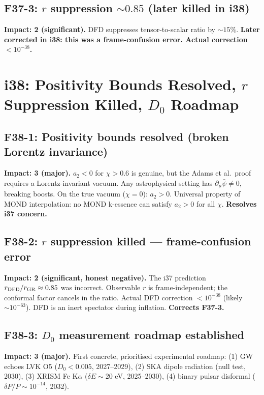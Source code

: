 \documentclass[11pt,a4paper]{article}
\begin{document}
\subsection{F37-3: $r$ suppression $\sim 0.85$ (later killed in i38)}
\textbf{Impact: 2 (significant).} DFD suppresses tensor-to-scalar ratio by $\sim 15\%$. \textbf{Later corrected in i38: this was a frame-confusion error. Actual correction $< 10^{-38}$.}

\section{i38: Positivity Bounds Resolved, $r$ Suppression Killed, $D_0$ Roadmap}
\label{sec:i38}

\subsection{F38-1: Positivity bounds resolved (broken Lorentz invariance)}
\textbf{Impact: 3 (major).} $a_2 < 0$ for $\chi > 0.6$ is genuine, but the Adams et al.\ proof requires a Lorentz-invariant vacuum. Any astrophysical setting has $\partial_\mu\bar\psi \neq 0$, breaking boosts. On the true vacuum ($\chi = 0$): $a_2 > 0$. Universal property of MOND interpolation: no MOND k-essence can satisfy $a_2 > 0$ for all $\chi$. \textbf{Resolves i37 concern.}

\subsection{F38-2: $r$ suppression killed --- frame-confusion error}
\textbf{Impact: 2 (significant, honest negative).} The i37 prediction $r_{\rm DFD}/r_{\rm GR} \approx 0.85$ was incorrect. Observable $r$ is frame-independent; the conformal factor cancels in the ratio. Actual DFD correction $< 10^{-38}$ (likely $\sim 10^{-63}$). DFD is an inert spectator during inflation. \textbf{Corrects F37-3.}

\subsection{F38-3: $D_0$ measurement roadmap established}
\textbf{Impact: 3 (major).} First concrete, prioritised experimental roadmap: (1) GW echoes LVK O5 ($D_0 < 0.005$, 2027--2029), (2) SKA dipole radiation (null test, 2030), (3) XRISM Fe K$\alpha$ ($\delta E \sim 20$ eV, 2025--2030), (4) binary pulsar disformal ($\delta P/P \sim 10^{-14}$, 2032).
\end{document}
